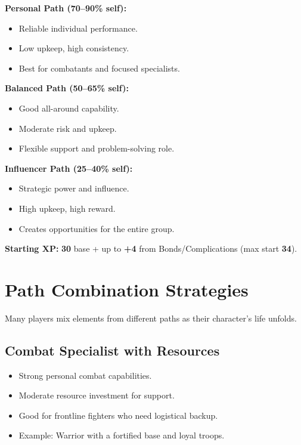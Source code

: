 \begin{tcolorbox}[colback=green!5!white,colframe=green!75!black,title=XP Path Quick Reference,fonttitle=\bfseries,breakable]
\textbf{Personal Path (70--90\% self):}
\begin{itemize}
\item Reliable individual performance.
\item Low upkeep, high consistency.
\item Best for combatants and focused specialists.
\end{itemize}

\textbf{Balanced Path (50--65\% self):}
\begin{itemize}
\item Good all-around capability.
\item Moderate risk and upkeep.
\item Flexible support and problem-solving role.
\end{itemize}

\textbf{Influencer Path (25--40\% self):}
\begin{itemize}
\item Strategic power and influence.
\item High upkeep, high reward.
\item Creates opportunities for the entire group.
\end{itemize}

\textbf{Starting XP:} \textbf{30} base \;+\; up to \textbf{+4} from Bonds/Complications (max start \textbf{34}).
\end{tcolorbox}


\section{Path Combination Strategies}
\label{sec:xp-combinations}

Many players mix elements from different paths as their character's life
unfolds.

\subsection*{Combat Specialist with Resources}
\begin{itemize}
\item Strong personal combat capabilities.
\item Moderate resource investment for support.
\item Good for frontline fighters who need logistical backup.
\item Example: Warrior with a fortified base and loyal troops.
\end{itemize}

